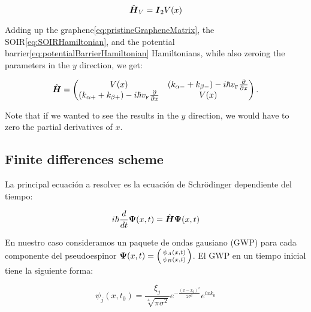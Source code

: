 \begin{equation}
    \label{eq:potentialBarrierHamiltonian}
    \hat{\mbox{\boldmath $H$}}_V=\mbox{\boldmath $I$}_2 V(x)
\end{equation}

Adding up the graphene\eqref{eq:pristineGrapheneMatrix}, the SOIR\eqref{eq:SOIRHamiltonian}, and the potential barrier\eqref{eq:potentialBarrierHamiltonian} Hamiltonians, while also zeroing the parameters in the $y$ direction, we get:

\begin{equation}
    \label{eq:hybridHamiltonian}
    \hat{\mbox{\boldmath $H$}}=
    \begin{pmatrix}
        V(x)                                                                                   & \left(k_{\alpha-}+k_{\beta-}\right)-i\hbar v_{\mbox{\tiny F}}\frac{\partial}{\partial x} \\
        \left(k_{\alpha+}+k_{\beta+}\right)-i\hbar v_{\mbox{\tiny F}}\frac{\partial}{\partial x} & V(x)
    \end{pmatrix}.
\end{equation}

Note that if we wanted to see the results in the $y$ direction, we would have to zero the partial derivatives of $x$.

\subsection{Finite differences scheme}\label{subsec:finite-differences-scheme}

La principal ecuación a resolver es la ecuación de Schrödinger dependiente del tiempo:

\begin{equation}
    \label{eq:schrodingerTimeDependent}
    i\hbar \frac{d}{dt}\mbox{\boldmath $\Psi$}(x,t) = \hat{\mbox{\boldmath $H$}}\mbox{\boldmath $\Psi$}(x,t)
\end{equation}

En nuestro caso consideramos un paquete de ondas gausiano (GWP) para cada componente del pseudoespinor $\bn{\Psi}(x,t)=\begin{psmallmatrix*}
                                                                                                                           \psi_A(x,t)\\\psi_B(x,t)
\end{psmallmatrix*}$.
El GWP en un tiempo inicial tiene la siguiente forma:

\begin{equation}
    \label{eq:GWP}
    \psi_j(x,t_0)=\frac{\xi_j}{\sqrt[4]{\pi\sigma^2}}e^{-\frac{(x-x_0)^2}{2\sigma^2}}e^{ixk_0}
\end{equation}

